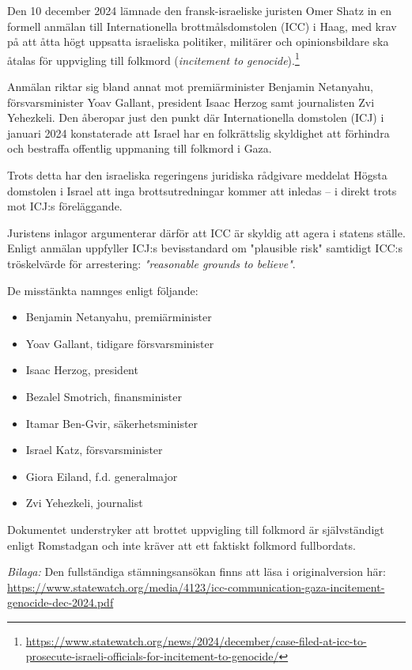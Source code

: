 Den 10 december 2024 lämnade den fransk-israeliske juristen Omer Shatz in en formell anmälan till Internationella brottmålsdomstolen (ICC) i Haag, med krav på att åtta högt uppsatta israeliska politiker, militärer och opinionsbildare ska åtalas för uppvigling till folkmord (\textit{incitement to genocide}).\footnote{\url{https://www.statewatch.org/news/2024/december/case-filed-at-icc-to-prosecute-israeli-officials-for-incitement-to-genocide/}}

Anmälan riktar sig bland annat mot premiärminister Benjamin Netanyahu, försvarsminister Yoav Gallant, president Isaac Herzog samt journalisten Zvi Yehezkeli. Den åberopar just den punkt där Internationella domstolen (ICJ) i januari 2024 konstaterade att Israel har en folkrättslig skyldighet att förhindra och bestraffa offentlig uppmaning till folkmord i Gaza.

Trots detta har den israeliska regeringens juridiska rådgivare meddelat Högsta domstolen i Israel att inga brottsutredningar kommer att inledas – i direkt trots mot ICJ:s föreläggande.

Juristens inlagor argumenterar därför att ICC är skyldig att agera i statens ställe. Enligt anmälan uppfyller ICJ:s bevisstandard om "plausible risk" samtidigt ICC:s tröskelvärde för arrestering: \textit{"reasonable grounds to believe"}.

De misstänkta namnges enligt följande:

\begin{itemize}
  \item Benjamin Netanyahu, premiärminister
  \item Yoav Gallant, tidigare försvarsminister
  \item Isaac Herzog, president
  \item Bezalel Smotrich, finansminister
  \item Itamar Ben-Gvir, säkerhetsminister
  \item Israel Katz, försvarsminister
  \item Giora Eiland, f.d. generalmajor
  \item Zvi Yehezkeli, journalist
\end{itemize}

Dokumentet understryker att brottet uppvigling till folkmord är självständigt enligt Romstadgan och inte kräver att ett faktiskt folkmord fullbordats.

\textit{Bilaga:} Den fullständiga stämningsansökan finns att läsa i originalversion här: \url{https://www.statewatch.org/media/4123/icc-communication-gaza-incitement-genocide-dec-2024.pdf}


